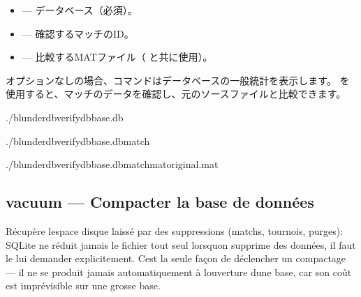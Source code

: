 \documentclass[letterpaper,10pt,dvipdfmx]{sphinxmanual}
\begin{document}
\sphinxAtStartPar
{}
\begin{itemize}
\item {} 
\sphinxAtStartPar
{} — データベース（必須）。

\item {} 
\sphinxAtStartPar
{} — 確認するマッチのID。

\item {} 
\sphinxAtStartPar
{} — 比較するMATファイル（ と共に使用）。

\end{itemize}

\sphinxAtStartPar
{} オプションなしの場合、コマンドはデータベースの一般統計を表示します。 を使用すると、マッチのデータを確認し、元のソースファイルと比較できます。

\sphinxAtStartPar
{}

\begin{sphinxVerbatim}[commandchars=\\\{\}]
./blunderdbverify\PYGZhy{}\PYGZhy{}dbbase.db

./blunderdbverify\PYGZhy{}\PYGZhy{}dbbase.db\PYGZhy{}\PYGZhy{}match

./blunderdbverify\PYGZhy{}\PYGZhy{}dbbase.db\PYGZhy{}\PYGZhy{}match\PYGZhy{}\PYGZhy{}matoriginal.mat
\end{sphinxVerbatim}


\subsection{vacuum — Compacter la base de données}
\label{\detokenize{cli:vacuum-compacter-la-base-de-donnees}}
\sphinxAtStartPar
Récupère l\textquotesingle{}espace disque laissé par des suppressions (matchs, tournois,
purges): SQLite ne réduit jamais le fichier tout seul lorsqu\textquotesingle{}on supprime des
données, il faut le lui demander explicitement. C\textquotesingle{}est la seule façon de
déclencher un compactage — il ne se produit jamais automatiquement à
l\textquotesingle{}ouverture d\textquotesingle{}une base, car son coût est imprévisible sur une grosse base.
\end{document}
